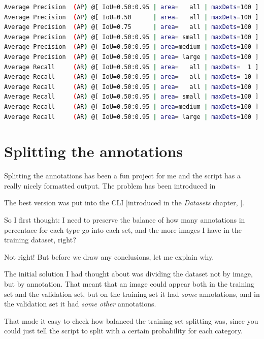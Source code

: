 \begin{lstlisting}[language=bash]
Average Precision  (AP) @[ IoU=0.50:0.95 | area=   all | maxDets=100 ] = 0.278
Average Precision  (AP) @[ IoU=0.50      | area=   all | maxDets=100 ] = 0.488
Average Precision  (AP) @[ IoU=0.75      | area=   all | maxDets=100 ] = 0.286
Average Precision  (AP) @[ IoU=0.50:0.95 | area= small | maxDets=100 ] = 0.127
Average Precision  (AP) @[ IoU=0.50:0.95 | area=medium | maxDets=100 ] = 0.312
Average Precision  (AP) @[ IoU=0.50:0.95 | area= large | maxDets=100 ] = 0.392
Average Recall     (AR) @[ IoU=0.50:0.95 | area=   all | maxDets=  1 ] = 0.251
Average Recall     (AR) @[ IoU=0.50:0.95 | area=   all | maxDets= 10 ] = 0.386
Average Recall     (AR) @[ IoU=0.50:0.95 | area=   all | maxDets=100 ] = 0.405
Average Recall     (AR) @[ IoU=0.50:0.95 | area= small | maxDets=100 ] = 0.219
Average Recall     (AR) @[ IoU=0.50:0.95 | area=medium | maxDets=100 ] = 0.452
Average Recall     (AR) @[ IoU=0.50:0.95 | area= large | maxDets=100 ] = 0.565
\end{lstlisting}


\section{Splitting the annotations}\label{s:splitting}

Splitting the annotations has been a fun project for me and the script has a really nicely formatted output. The problem has been introduced in 

The best version was put into the CLI [introduced in the \emph{Datasets} chapter, ].

So I first thought: I need to preserve the balance of how many annotations in percentace for each type go into each set, and the more images I have in the training dataset, right?

Not right! But before we draw any conclusions, let me explain why.

The initial solution I had thought about was dividing the dataset not by image, but by annotation. That meant that an image could appear both in the training set and the validation set, but on the training set it had \emph{some} annotations, and in the validation set it had \emph{some other} annotations.

That made it easy to check how balanced the training set splitting was, since you could just tell the script to split with a certain probability for each category.

